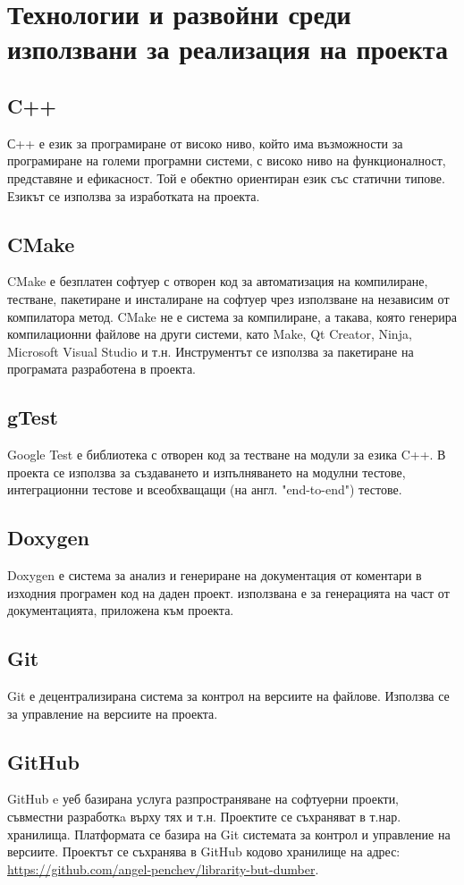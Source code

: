 \section{Технологии и развойни среди използвани за реализация на проекта}
\subsection{C++}
С++ е език за програмиране от високо ниво, който има възможности за програмиране на големи програмни системи, с високо ниво на функционалност, представяне и ефикасност. Той е обектно ориентиран език със статични типове. Езикът се използва за изработката на проекта.

\subsection{CMake}
CMake е безплатен софтуер с отворен код за автоматизация на компилиране, тестване, пакетиране и инсталиране на софтуер чрез използване на независим от компилатора метод. CMake не е система за компилиране, а такава, която генерира компилационни файлове на други системи, като Make, Qt Creator, Ninja, Microsoft Visual Studio и т.н. Инструментът се използва за пакетиране на програмата разработена в проекта.

\subsection{gTest}
Google Test е библиотека с отворен код за тестване на модули за езика C++. В проекта се използва за създаването и изпълняването на модулни тестове, интеграционни тестове и всеобхващащи (на англ. "end-to-end") тестове.

\subsection{Doxygen}
Doxygen е система за анализ и генериране на документация от коментари в изходния програмен код на даден проект. използвана е за генерацията на част от документацията, приложена към проекта.

\subsection{Git}
Git е децентрализирана система за контрол на версиите на файлове. Използва се за управление на версиите на проекта.

\subsection{GitHub}
GitHub e уеб базирана услуга разпространяване на софтуерни проекти, съвместни разработкa върху тях и т.н. Проектите се съхраняват в т.нар. хранилища. Платформата се базира на Git системата за контрол и управление на версиите. Проектът се съхранява в GitHub кодово хранилище на адрес: \url{https://github.com/angel-penchev/librarity-but-dumber}.

